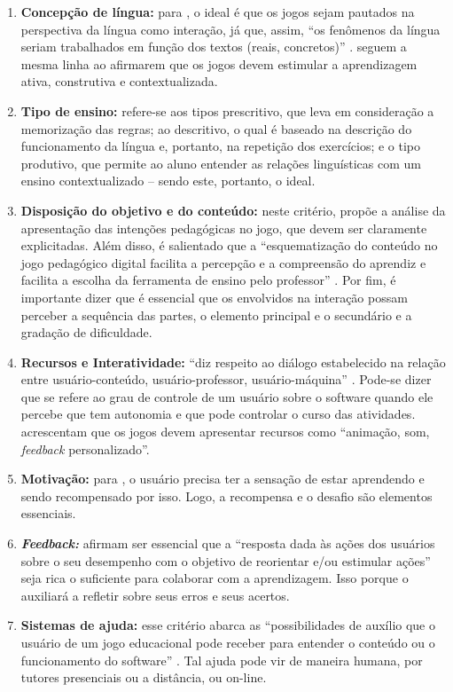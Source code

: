 \documentclass{textolivre}
\begin{document}
\begin{enumerate}
    \item \textbf{Concepção de língua:} para \textcite{ribeiro2013}, o ideal é que os jogos sejam pautados na perspectiva da língua como interação, já que, assim, “os fenômenos da língua seriam trabalhados em função dos textos (reais, concretos)” \cite[p. 73-74]{ribeiro2013}. \textcite{ribeiro2009} seguem a mesma linha ao afirmarem que os jogos devem estimular a aprendizagem ativa, construtiva e contextualizada. 
    \item \textbf{Tipo de ensino:} \textcite{ribeiro2013} refere-se aos tipos prescritivo, que leva em consideração a memorização das regras; ao descritivo, o qual é baseado na descrição do funcionamento da língua e, portanto, na repetição dos exercícios; e o tipo produtivo, que permite ao aluno entender as relações linguísticas com um ensino contextualizado  – sendo este, portanto, o ideal.
    \item \textbf{Disposição do objetivo e do conteúdo:} neste critério, \textcite{ribeiro2013} propõe a análise da apresentação das intenções pedagógicas no jogo, que devem ser claramente explicitadas. Além disso, é salientado que a “esquematização do conteúdo no jogo pedagógico digital facilita a percepção e a compreensão do aprendiz e facilita a escolha da ferramenta de ensino pelo professor” \cite[p. 77]{ribeiro2013}. Por fim, é importante dizer que é essencial que os envolvidos na interação possam perceber a sequência das partes, o elemento principal e o secundário e a gradação de dificuldade. 
    \item \textbf{Recursos e Interatividade:} “diz respeito ao diálogo estabelecido na relação entre usuário-conteúdo, usuário-professor, usuário-máquina” \cite[p. 83]{ribeiro2013}. Pode-se dizer que se refere ao grau de controle de um usuário sobre o software quando ele percebe que tem autonomia e que pode controlar o curso das atividades. \textcite[p. 5]{ribeiro2009} acrescentam que os jogos devem apresentar recursos como “animação, som, \emph{feedback} personalizado”. 
    \item \textbf{Motivação:} para \textcite{ribeiro2009}, o usuário precisa ter a sensação de estar aprendendo e sendo recompensado por isso. Logo, a recompensa e o desafio são elementos essenciais.
    \item \textbf{\emph{Feedback:}} \textcite[p. 6]{ribeiro2009} afirmam ser essencial que a “resposta dada às ações dos usuários sobre o seu desempenho com o objetivo de reorientar e/ou estimular ações” seja rica o suficiente para colaborar com a aprendizagem. Isso porque o auxiliará a refletir sobre seus erros e seus acertos. 
    \item \textbf{Sistemas de ajuda:} esse critério abarca as “possibilidades de auxílio que o usuário de um jogo educacional pode receber para entender o conteúdo ou o funcionamento do software” \cite[p. 77]{ribeiro2013}. Tal ajuda pode vir de maneira humana, por tutores presenciais ou a distância, ou on-line.
\end{enumerate}
\end{document}
